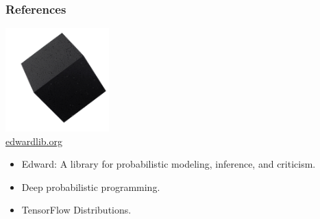 \documentclass[10pt,
               xcolor={usenames,dvipsnames},
               hyperref={colorlinks,linktoc=all,citecolor=Plum,linkcolor=MidnightBlue,urlcolor=MidnightBlue},noamssymb]{beamer}
\begin{document}
\begin{frame}
\frametitle{References}
\begin{center}
\includegraphics[width=0.3\textwidth]{img/edward.png}
\\
\large \url{edwardlib.org}
\end{center}
\vspace{1ex}

\begin{itemize}
\item
Edward: A library for probabilistic modeling, inference, and
criticism. \\
\item
Deep probabilistic programming. \\
\item
TensorFlow Distributions. \\
\end{itemize}
\end{frame}
\end{document}
